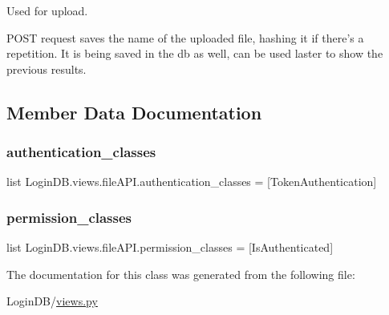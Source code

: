 Used for upload. 

\begin{DoxyVerb}POST request saves the name of the uploaded file, hashing it if there's a repetition.
It is being saved in the db as well, can be used laster to show the previous results.
\end{DoxyVerb}
 

\subsection{Member Data Documentation}
\mbox{\label{class_login_d_b_1_1views_1_1file_a_p_i_a5883c87de1e62d011e0d3868c74a5dce}} 
\subsubsection{\texorpdfstring{authentication\+\_\+classes}{authentication\_classes}}
{\footnotesize\ttfamily list Login\+D\+B.\+views.\+file\+A\+P\+I.\+authentication\+\_\+classes = \mbox{[}Token\+Authentication\mbox{]}\hspace{0.3cm}{\ttfamily [static]}}

\mbox{\label{class_login_d_b_1_1views_1_1file_a_p_i_a624b994a7019e545df5c9a4d10d256bd}} 
\subsubsection{\texorpdfstring{permission\+\_\+classes}{permission\_classes}}
{\footnotesize\ttfamily list Login\+D\+B.\+views.\+file\+A\+P\+I.\+permission\+\_\+classes = \mbox{[}Is\+Authenticated\mbox{]}\hspace{0.3cm}{\ttfamily [static]}}



The documentation for this class was generated from the following file\+:\begin{DoxyCompactItemize}
\item 
Login\+D\+B/\hyperlink{views_8py}{views.\+py}\end{DoxyCompactItemize}
